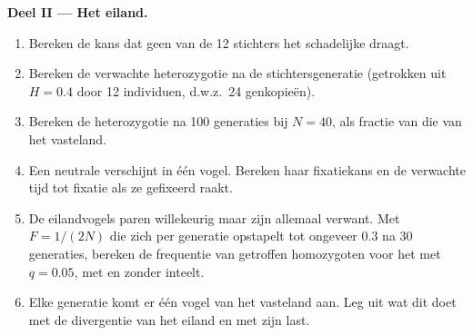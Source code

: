 \begin{problem}
\medskip
\noindent\textbf{Deel II --- Het eiland.}
\begin{enumerate}[resume]
  \item Bereken de kans dat geen van de 12 stichters het schadelijke 
        draagt.
  \item Bereken de verwachte heterozygotie na de stichtersgeneratie
        (getrokken uit $H = 0.4$ door 12 individuen, d.w.z.\ 24
        genkopieën).
  \item Bereken de heterozygotie na 100 generaties bij $N =
        40$, als fractie van die van het vasteland.
  \item Een neutrale  verschijnt in één vogel. Bereken haar
        fixatiekans en de verwachte tijd tot fixatie als ze
        gefixeerd raakt.
  \item De eilandvogels paren willekeurig maar zijn allemaal verwant. Met
        $F = 1/(2N)$ die zich per generatie opstapelt tot ongeveer $0.3$ na
        30 generaties, bereken de frequentie van getroffen homozygoten
        voor het  met $q = 0.05$, met en zonder inteelt.
  \item Elke generatie komt er één vogel van het vasteland aan. Leg uit wat
        dit doet met de divergentie van het eiland en met zijn last.
\end{enumerate}


\end{problem}
